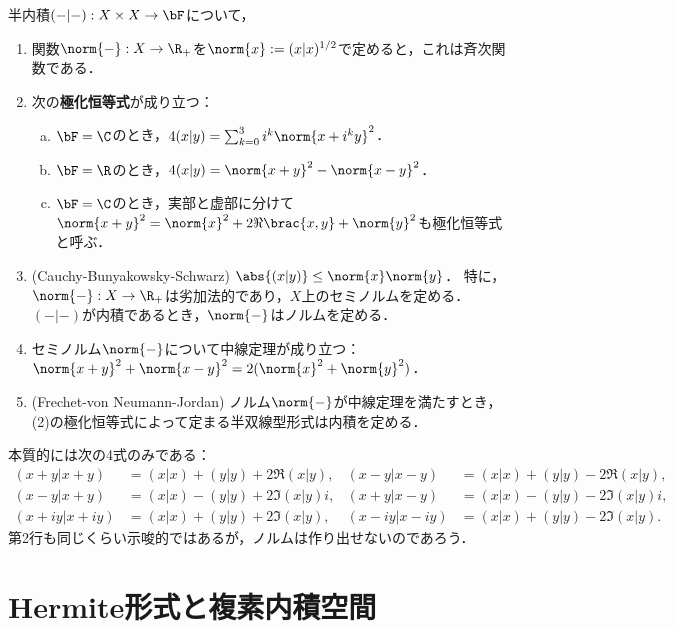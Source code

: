 \documentclass[uplatex, dvipdfmx]{jsreport}
\begin{document}
\begin{proposition}\label{prop-polarization-identity}
    半内積$(-|-):X\times X\to\bF$について，
    \begin{enumerate}
        \item 関数$\norm{-}:X\to\R_+$を$\norm{x}:=(x|x)^{1/2}$で定めると，これは斉次関数である．
        \item 次の\textbf{極化恒等式}が成り立つ：
        \begin{enumerate}[(a)]
            \item $\bF=\C$のとき，$4(x|y)=\sum^3_{k=0}i^k\norm{x+i^ky}^2$．
            \item $\bF=\R$のとき，$4(x|y)=\norm{x+y}^2-\norm{x-y}^2$．
            \item $\bF=\C$のとき，実部と虚部に分けて$\norm{x+y}^2=\norm{x}^2+2\Re\brac{x,y}+\norm{y}^2$も極化恒等式と呼ぶ．
        \end{enumerate}
        \item (Cauchy-Bunyakowsky-Schwarz) $\abs{(x|y)}\le\norm{x}\norm{y}$．
        特に，$\norm{-}:X\to\R_+$は劣加法的であり，$X$上のセミノルムを定める．
        $(-|-)$が内積であるとき，$\norm{-}$はノルムを定める．
        \item セミノルム$\norm{-}$について中線定理が成り立つ：$\norm{x+y}^2+\norm{x-y}^2=2(\norm{x}^2+\norm{y}^2)$．
        \item (Frechet-von Neumann-Jordan) ノルム$\norm{-}$が中線定理を満たすとき，(2)の極化恒等式によって定まる半双線型形式は内積を定める．
    \end{enumerate}
\end{proposition}
\begin{remarks}
    本質的には次の4式のみである：
    \begin{align*}
        (x+y|x+y)&=(x|x)+(y|y)+2\Re(x|y),&(x-y|x-y)&=(x|x)+(y|y)-2\Re(x|y),\\
        (x-y|x+y)&=(x|x)-(y|y)+2\Im(x|y)i,&(x+y|x-y)&=(x|x)-(y|y)-2\Im(x|y)i,\\
        (x+iy|x+iy)&=(x|x)+(y|y)+2\Im(x|y),&(x-iy|x-iy)&=(x|x)+(y|y)-2\Im(x|y).
    \end{align*}
    第2行も同じくらい示唆的ではあるが，ノルムは作り出せないのであろう．
\end{remarks}


\section{Hermite形式と複素内積空間}
\end{document}
